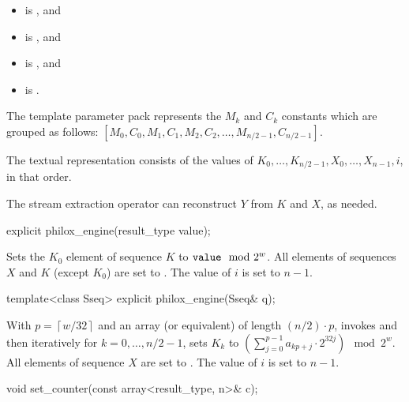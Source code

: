 \pnum
\mandates
\begin{itemize}
\item {} is , and
\item {} is , and
\item {} is , and
\item {} is .
\end{itemize}

\pnum
The template parameter pack  represents
the $M_k$ and $C_k$ constants which are grouped as follows:
$[ M_0, C_0, M_1, C_1, M_2, C_2, \dotsc, M_{n/2 - 1}, C_{n/2 - 1} ]$.

\pnum
The textual representation consists of the values of
$K_0, \dotsc, K_{n/2 - 1}, X_{0}, \dotsc, X_{n - 1}, i$, in that order.
\begin{note}
The stream extraction operator can reconstruct $Y$ from $K$ and $X$, as needed.
\end{note}

\begin{itemdecl}
explicit philox_engine(result_type value);
\end{itemdecl}

\begin{itemdescr}
\pnum
\effects
Sets the $K_0$ element of sequence $K$ to $\tcode{value} \mod 2^w$.
All elements of sequences $X$ and $K$ (except $K_0$) are set to .
The value of $i$ is set to $n - 1$.
\end{itemdescr}

\begin{itemdecl}
template<class Sseq> explicit philox_engine(Sseq& q);
\end{itemdecl}

\begin{itemdescr}
\pnum
\effects
With $p = \left\lceil w / 32 \right\rceil$ and
an array (or equivalent)  of length $(n/2) \cdot p$,
invokes  and
then iteratively for $k = 0, \dotsc, n/2 - 1$,
sets $K_k$ to
$\left(\sum_{j = 0}^{p - 1} a_{k p + j} \cdot 2^{32j} \right) \mod 2^w$.
All elements of sequence $X$ are set to .
The value of $i$ is set to $n - 1$.
\end{itemdescr}

%
\begin{itemdecl}
void set_counter(const array<result_type, n>& c);
\end{itemdecl}

